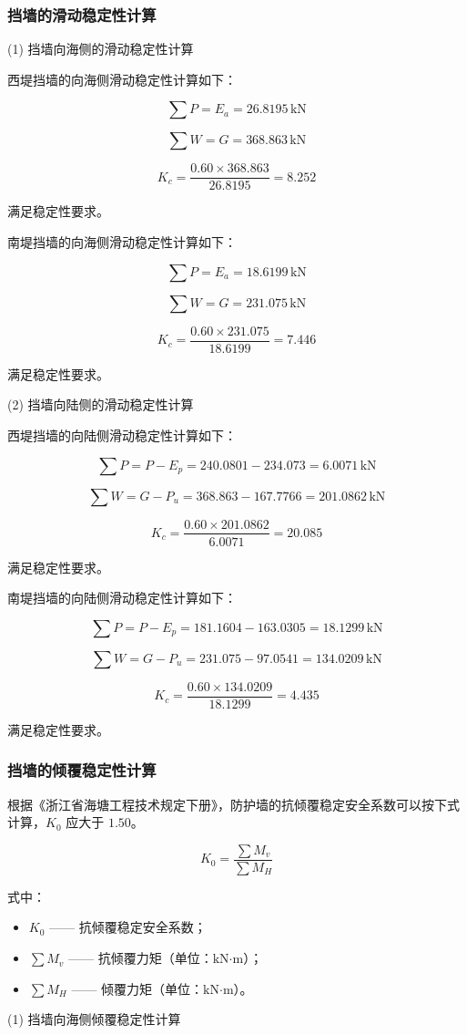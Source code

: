 \documentclass[UTF8, a4paper, 12pt]{ctexart} %
\begin{document}
\subsubsection{挡墙的滑动稳定性计算}

(1) 挡墙向海侧的滑动稳定性计算

西堤挡墙的向海侧滑动稳定性计算如下：

\[
\sum P = E_a = 26.8195\,\text{kN}
\]

\[
\sum W = G = 368.863\,\text{kN}
\]

\[
K_c = \frac{0.60 \times 368.863}{26.8195} = 8.252
\]

满足稳定性要求。

南堤挡墙的向海侧滑动稳定性计算如下：

\[
\sum P = E_a = 18.6199\,\text{kN}
\]

\[
\sum W = G = 231.075\,\text{kN}
\]

\[
K_c = \frac{0.60 \times 231.075}{18.6199} = 7.446
\]

满足稳定性要求。

(2) 挡墙向陆侧的滑动稳定性计算

西堤挡墙的向陆侧滑动稳定性计算如下：

\[
\sum P = P - E_p = 240.0801 - 234.073 = 6.0071\,\text{kN}
\]

\[
\sum W = G - P_u = 368.863 - 167.7766 = 201.0862\,\text{kN}
\]

\[
K_c = \frac{0.60 \times 201.0862}{6.0071} = 20.085
\]

满足稳定性要求。

南堤挡墙的向陆侧滑动稳定性计算如下：

\[
\sum P = P - E_p = 181.1604 - 163.0305 = 18.1299\,\text{kN}
\]

\[
\sum W = G - P_u = 231.075 - 97.0541 = 134.0209\,\text{kN}
\]

\[
K_c = \frac{0.60 \times 134.0209}{18.1299} = 4.435
\]

满足稳定性要求。
\subsubsection{挡墙的倾覆稳定性计算}
根据《浙江省海塘工程技术规定下册》，防护墙的抗倾覆稳定安全系数可以按下式计算，$K_0$ 应大于 $1.50$。

\begin{equation}
K_0 = \frac{\sum M_v}{\sum M_H}
\end{equation}



式中：
\begin{itemize}
    \item $K_0$ —— 抗倾覆稳定安全系数；
    \item $\sum M_v$ —— 抗倾覆力矩（单位：$\text{kN·m}$）；
    \item $\sum M_H$ —— 倾覆力矩（单位：$\text{kN·m}$）。
\end{itemize}
(1) 挡墙向海侧倾覆稳定性计算
\end{document}
